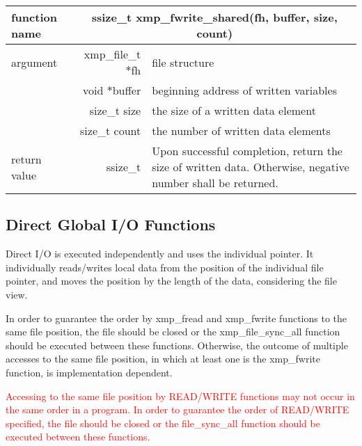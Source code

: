    \begin{table}[h]
    \begin{center}
     \begin{tabular}{|l|r|p{80mm}|}
      \hline
      {\bf function name}  & \multicolumn{2}{c|}{\bf ssize\_t
        xmp\_fwrite\_shared(fh, buffer, size, count)} \\ \hline \hline
      argument & xmp\_file\_t $*$fh & file structure \\ \cline{2-3}
      & void $*$buffer & beginning address of written variables \\ \cline{2-3}
      & size\_t size & the size of a written data element \\ \cline{2-3}
      & size\_t count & the number of written data elements \\ \hline
      return value & ssize\_t & Upon successful completion, return the size
	      of written data. Otherwise, negative number shall be
	      returned. \\ \hline
      \end{tabular}
     \end{center}
    \label{tb:aaa}
   \end{table}


   \subsection{Direct Global I/O Functions}

   Direct I/O is executed independently and uses the individual pointer. 
   It individually reads/writes local data
   from the position of the individual file pointer, and 
   moves the position by the length of the data, considering the file view.

   In order to guarantee the order by xmp\_fread and xmp\_fwrite functions to the same file position, the file should be closed or the xmp\_file\_sync\_all function should be executed between these functions. Otherwise, the outcome of multiple accesses to the same file position, in which at least one is the xmp\_fwrite function, is implementation dependent.
   
   \textcolor{red}{
     Accessing to the same file position by READ/WRITE functions may not
     occur in the same order in a program. In order to guarantee the
     order of READ/WRITE specified, the file should be closed or the
     file\_sync\_all function should be executed between these functions.
     }
   \fi
   
